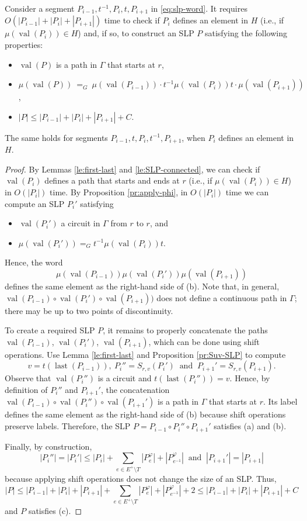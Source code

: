 \documentclass[10pt,a4paper]{amsart}
\DeclareMathOperator{\last}{{last}}
\DeclareMathOperator{\val}{val}
\begin{document}
\begin{proposition}\label{pr:main-step-case-I}
Consider a segment $P_{i-1},t^{-1},P_i,t,P_{i+1}$ in \eqref{eq:slp-word}.
It requires $O(|P_{i-1}|+|P_{i}|+|P_{i+1}|)$ time to check if
$P_i$ defines an element in $H$ 
(i.e., if $\mu(\val(P_i)) \in H$)
and, if so, to construct
an SLP $P$ satisfying the following properties:
\begin{itemize}
\item[(a)]
$\val(P)$ is a path in $\Gamma$ that starts at $r$,
\item[(b)]
$\mu(\val(P))\ =_G\ 
\mu(\val(P_{i-1})) 
\cdot
t^{-1} \mu(\val(P_{i})) t
\cdot
\mu(\val(P_{i+1}))$,
\item[(c)]
$|P| \le |P_{i-1}| + |P_i| + |P_{i+1}| + C$.
\end{itemize}
The same holds for segments $P_{i-1},t,P_i,t^{-1},P_{i+1}$, when
$P_i$ defines an element in $H$.
\end{proposition}

\begin{proof}
By Lemmas \ref{le:first-last} and \ref{le:SLP-connected},
we can check if $\val(P_i)$ defines a path that
starts and ends at $r$ (i.e., if $\mu(\val(P_i)) \in H$)
in $O(|P_i|)$ time.
By Proposition \ref{pr:apply-phi}, 
in $O(|P_i|)$ time we can compute an SLP $P_i'$ satisfying
\begin{itemize}
\item 
$\val(P_i')$ a circuit in $\Gamma$ from $r$ to $r$, and
\item 
$\mu(\val(P_i')) =_G t^{-1} \mu(\val(P_i)) t$.
\end{itemize}
Hence, the word
$$
\mu(\val(P_{i-1}))\mu(\val(P_{i}'))\mu(\val(P_{i+1}))
$$
defines the same element as the right-hand side of (b).
Note that, in general,
$\val(P_{i-1}) \circ \val(P_{i}') \circ \val(P_{i+1}))$
does not define a continuous path in $\Gamma$; 
there may be up to two points of discontinuity.

To create a required SLP $P$, it remains to 
properly concatenate the paths
$\val(P_{i-1})$, $\val(P_{i}')$, $\val(P_{i+1})$,
which can be done using shift operations.
Use Lemma \ref{le:first-last} and Proposition \ref{pr:Suv-SLP}
to compute 
$$
v = t(\last(P_{i-1})),
\ P_i''=S_{r,v}(P_i')
\ \mbox{ and }\ 
P_{i+1}'=S_{r,v}(P_{i+1}).
$$
Observe that $\val(P_i'')$ is a circuit and $t(\last(P_{i}'')) = v$.
Hence, by definition of $P_i''$ and $P_{i+1}'$,
the concatenation
$\val(P_{i-1}) \circ \val(P_i'') \circ \val(P_{i+1}')$
is a path in $\Gamma$ that starts at $r$.
Its label defines the same element as the right-hand side of (b)
because shift operations preserve labels.
Therefore, the SLP $P = P_{i-1} \circ P_i''\circ P_{i+1}'$
satisfies (a) and (b).

Finally, by construction,
$$
|P_i''| = |P_i'| \le |P_i| + \sum_{e\in E^+\setminus T}
|P_e^\varphi|+
|P_{e^{-1}}^\varphi|
\ \mbox{ and }\ 
|P_{i+1}'| = |P_{i+1}|
$$
because applying shift operations does not change the size of an SLP.
Thus, 
$$
|P| \le 
|P_{i-1}|+|P_{i}| + |P_{i+1}|+
\sum_{e\in E^+\setminus T}
|P_e^\varphi|+
|P_{e^{-1}}^\varphi| +2
\le |P_{i-1}| + |P_{i}| + |P_{i+1}| + C
$$
and $P$ satisfies (c).
\end{proof}
\end{document}
